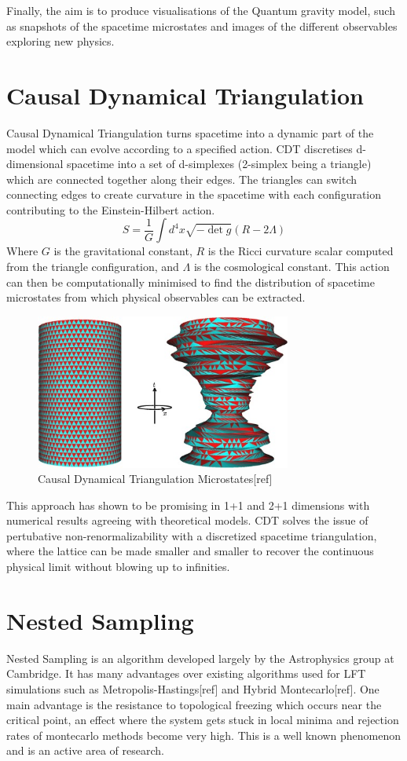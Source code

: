 \documentclass[draft]{article}
\begin{document}
    Finally, the aim is to produce visualisations of the Quantum gravity model, such as snapshots of the spacetime microstates and images of the different observables exploring new physics.

    \section{Causal Dynamical Triangulation}
    Causal Dynamical Triangulation turns spacetime into a dynamic part of the model which can evolve according to a specified action. CDT discretises d-dimensional spacetime into a set of d-simplexes (2-simplex being a triangle) which are connected together along their edges. The triangles can switch connecting edges to create curvature in the spacetime with each configuration contributing to the Einstein-Hilbert action. 
    $$S = \frac{1}{G} \int{d^4x \sqrt{ - \det g} ( R - 2\Lambda ) } $$
    Where $G$ is the gravitational constant, $R$ is the Ricci curvature scalar computed from the triangle configuration, and $\Lambda$ is the cosmological constant. This action can then be computationally minimised to find the distribution of spacetime microstates from which physical observables can be extracted.

\begin{figure}[H]
\centering
\includegraphics[width=0.75\textwidth]{cdt.jpeg}
\caption{Causal Dynamical Triangulation Microstates[ref]}
\end{figure}

    This approach has shown to be promising in 1+1 and 2+1 dimensions with numerical results agreeing with theoretical models. CDT solves the issue of pertubative non-renormalizability with a discretized spacetime triangulation, where the lattice can be made smaller and smaller to recover the continuous physical limit without blowing up to infinities. 

    \section{Nested Sampling}
    Nested Sampling is an algorithm developed largely by the Astrophysics group at Cambridge. It has many advantages over existing algorithms used for LFT simulations such as Metropolis-Hastings[ref] and Hybrid Montecarlo[ref]. One main advantage is the resistance to topological freezing which occurs near the critical point, an effect where the system gets stuck in local minima and rejection rates of montecarlo methods become very high. This is a well known phenomenon and is an active area of research.
\end{document}
